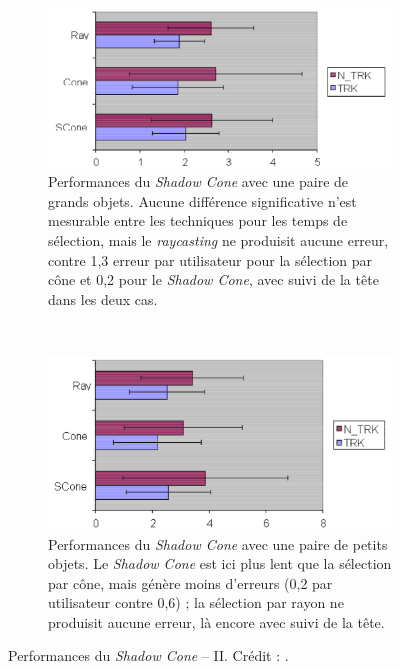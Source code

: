 	\begin{figure}[!htb]
		\begin{subfigure}[t]{0.49\textwidth}
			\centering
			\includegraphics[width=\textwidth]{figures/ch2/shadowPLarge}
			\caption{Performances du \emph{Shadow Cone} avec une paire de grands objets. Aucune différence significative n'est mesurable entre les techniques pour les temps de sélection, mais le \emph{raycasting} ne produisit aucune erreur, contre 1,3 erreur par utilisateur pour la sélection par cône et 0,2 pour le \emph{Shadow Cone}, avec suivi de la tête dans les deux cas.}
			\label{fig:shadowPLarge}
		\end{subfigure}
		~
		\begin{subfigure}[t]{0.49\textwidth}
			\centering
			\includegraphics[width=\textwidth]{figures/ch2/shadowPSmall}
			\caption{Performances du \emph{Shadow Cone} avec une paire de petits objets. Le \emph{Shadow Cone} est ici plus lent que la sélection par cône, mais génère moins d'erreurs (0,2 par utilisateur contre 0,6) ; la sélection par rayon ne produisit aucune erreur, là encore avec suivi de la tête.}
			\label{fig:shadowPSmall}
		\end{subfigure}
		\caption[Performances du \emph{Shadow Cone} -- II]{Performances du \emph{Shadow Cone} -- II. Crédit : \cite{steed20043d}.}
		\label{fig:shadowConePerf2}
	\end{figure}

